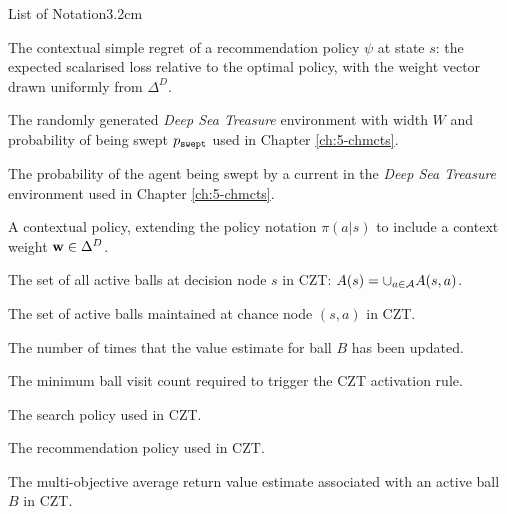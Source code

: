 \begin{mclistof}{List of Notation}{3.2cm}
    \item[$\ctxsreg(s,\psi)$]
        \hspace{0.45cm} The \textnormal{contextual simple regret} of a recommendation policy $\psi$ at state $s$: the expected scalarised loss relative to the optimal policy, with the weight vector drawn uniformly from $\Delta^D$.
    \item[$\DST(W,\pswept)$]
        The randomly generated \textit{Deep Sea Treasure} environment with width $W$ and probability of being swept $\pswept$ used in Chapter \ref{ch:5-chmcts}.
    \item[$\pswept$]
        The probability of the agent being swept by a current in the \textit{Deep Sea Treasure} environment used in Chapter \ref{ch:5-chmcts}.
    \item[$\pi(a|s;\bff{w})$]
        A \textnormal{contextual policy}, extending the policy notation $\pi(a|s)$ to include a context weight $\mathbf{w}\in\Delta^D$. %
    \\
    \item[$A(s)$]
        The set of all active balls at decision node $s$ in CZT: $A(s)=\cup_{a\in\mathcal{A}}A(s,a)$.
    \item[$A(s,a)$]
        The set of active balls maintained at chance node $(s,a)$ in CZT.
    \item[$M(B)$]
        The number of times that the value estimate for ball $B$ has been updated.
    \item[$\Mmin$]
        The minimum ball visit count required to trigger the CZT activation rule.
    \item[$\piczt$]
        The search policy used in CZT.
    \item[$\psiczt$]
        The recommendation policy used in CZT.
    \item[$\Qczt(B)$]
        The multi-objective average return value estimate associated with an active ball $B$ in CZT.
    \item[$\relevant(s;\bff{w})$] 

\end{mclistof}
